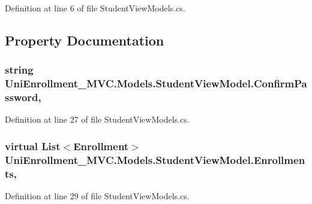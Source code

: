 Definition at line 6 of file Student\+View\+Models.\+cs.



\subsection{Property Documentation}
\subsubsection[{\texorpdfstring{Confirm\+Password}{ConfirmPassword}}]{\setlength{\rightskip}{0pt plus 5cm}string Uni\+Enrollment\+\_\+\+M\+V\+C.\+Models.\+Student\+View\+Model.\+Confirm\+Password\hspace{0.3cm}{\ttfamily [get]}, {\ttfamily [set]}}\hypertarget{class_uni_enrollment___m_v_c_1_1_models_1_1_student_view_model_a26c1bc2dba6280be30f91fc1e04e3c54}{}\label{class_uni_enrollment___m_v_c_1_1_models_1_1_student_view_model_a26c1bc2dba6280be30f91fc1e04e3c54}


Definition at line 27 of file Student\+View\+Models.\+cs.

\subsubsection[{\texorpdfstring{Enrollments}{Enrollments}}]{\setlength{\rightskip}{0pt plus 5cm}virtual List$<${\bf Enrollment}$>$ Uni\+Enrollment\+\_\+\+M\+V\+C.\+Models.\+Student\+View\+Model.\+Enrollments\hspace{0.3cm}{\ttfamily [get]}, {\ttfamily [set]}}\hypertarget{class_uni_enrollment___m_v_c_1_1_models_1_1_student_view_model_a5d41cb2b71a552312bf0fcf7ae8e50ac}{}\label{class_uni_enrollment___m_v_c_1_1_models_1_1_student_view_model_a5d41cb2b71a552312bf0fcf7ae8e50ac}


Definition at line 29 of file Student\+View\+Models.\+cs.

